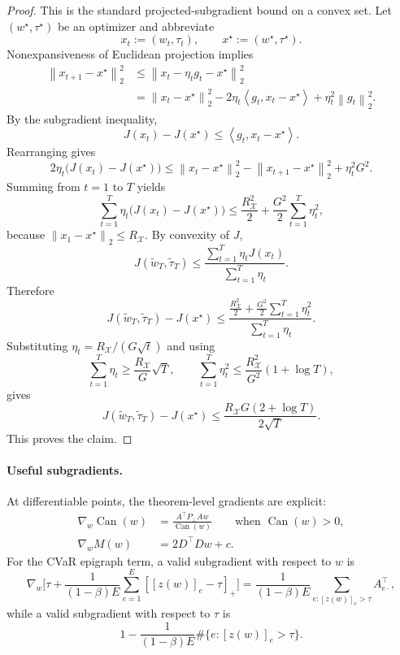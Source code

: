 \documentclass[11pt]{article}
\newcommand{\1}{\mathbf{1}}
\newcommand{\norm}[1]{\left\lVert #1 \right\rVert}
\newcommand{\ip}[2]{\left\langle #1, #2 \right\rangle}
\newcommand{\Pperp}{P_\perp}
\theoremstyle{plain}
\theoremstyle{definition}
\theoremstyle{remark}
\begin{document}
\begin{proof}
This is the standard projected-subgradient bound on a convex set. Let $(w^\star,\tau^\star)$ be an optimizer and abbreviate
\[
x_t := (w_t,\tau_t), \qquad x^\star := (w^\star,\tau^\star).
\]
Nonexpansiveness of Euclidean projection implies
\begin{align*}
\norm{x_{t+1}-x^\star}_2^2
&\le \norm{x_t-\eta_t g_t-x^\star}_2^2 \\
&= \norm{x_t-x^\star}_2^2 - 2\eta_t\ip{g_t}{x_t-x^\star} + \eta_t^2\norm{g_t}_2^2.
\end{align*}
By the subgradient inequality,
\[
J(x_t)-J(x^\star) \le \ip{g_t}{x_t-x^\star}.
\]
Rearranging gives
\[
2\eta_t\bigl(J(x_t)-J(x^\star)\bigr)
\le \norm{x_t-x^\star}_2^2 - \norm{x_{t+1}-x^\star}_2^2 + \eta_t^2 G^2.
\]
Summing from $t=1$ to $T$ yields
\[
\sum_{t=1}^T \eta_t\bigl(J(x_t)-J(x^\star)\bigr)
\le \frac{R_{\mathcal{X}}^2}{2} + \frac{G^2}{2}\sum_{t=1}^T \eta_t^2,
\]
because $\norm{x_1-x^\star}_2\le R_{\mathcal{X}}$. By convexity of $J$,
\[
J(\tilde w_T,\tilde\tau_T)
\le \frac{\sum_{t=1}^T \eta_t J(x_t)}{\sum_{t=1}^T \eta_t}.
\]
Therefore
\[
J(\tilde w_T,\tilde\tau_T)-J(x^\star)
\le \frac{\frac{R_{\mathcal{X}}^2}{2} + \frac{G^2}{2}\sum_{t=1}^T \eta_t^2}{\sum_{t=1}^T \eta_t}.
\]
Substituting $\eta_t = R_{\mathcal{X}}/(G\sqrt{t})$ and using
\[
\sum_{t=1}^T \eta_t \ge \frac{R_{\mathcal{X}}}{G}\sqrt{T},
\qquad
\sum_{t=1}^T \eta_t^2 \le \frac{R_{\mathcal{X}}^2}{G^2}(1+\log T),
\]
gives
\[
J(\tilde w_T,\tilde\tau_T)-J(x^\star)
\le \frac{R_{\mathcal{X}}G(2+\log T)}{2\sqrt{T}}.
\]
This proves the claim.
\end{proof}

\paragraph{Useful subgradients.}
At differentiable points, the theorem-level gradients are explicit:
\begin{align*}
\nabla_w \operatorname{Can}(w)
&= \frac{A^\top \Pperp A w}{\operatorname{Can}(w)} \qquad \text{when } \operatorname{Can}(w)>0, \\
\nabla_w M(w)
&= 2D^\top D w + c.
\end{align*}
For the CVaR epigraph term, a valid subgradient with respect to $w$ is
\[
\nabla_w\Biggl[\tau + \frac{1}{(1-\beta)E}\sum_{e=1}^E[[z(w)]_e - \tau]_+\Biggr]
= \frac{1}{(1-\beta)E}\sum_{e:[z(w)]_e > \tau} A_{e\cdot}^\top,
\]
while a valid subgradient with respect to $\tau$ is
\[
1 - \frac{1}{(1-\beta)E}\#\{e : [z(w)]_e > \tau\}.
\]
\end{document}
